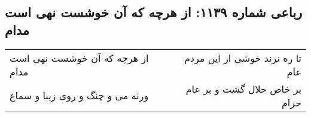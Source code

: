 \begin{center}
\section*{رباعی شماره ۱۱۳۹: از هرچه که آن خوشست نهی است مدام}
\label{sec:1139}
\begin{longtable}{l p{0.5cm} r}
از هرچه که آن خوشست نهی است مدام
&&
تا ره نزند خوشی از این مردم عام
\\
ورنه می و چنگ و روی زیبا و سماع
&&
بر خاص حلال گشت و بر عام حرام
\\
\end{longtable}
\end{center}
